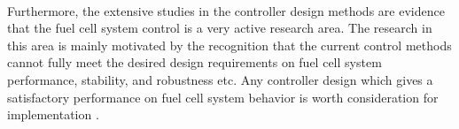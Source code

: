 \paragraph{}Furthermore, the extensive studies in the controller design methods are evidence that the fuel cell system control is a very active research area. The research in this area is mainly motivated by the recognition that the current control methods cannot fully meet the desired design requirements on fuel cell system performance, stability, and robustness etc. Any controller design which gives a satisfactory performance on fuel cell system behavior is worth consideration for implementation \cite{ehsani_modern_2018}.

